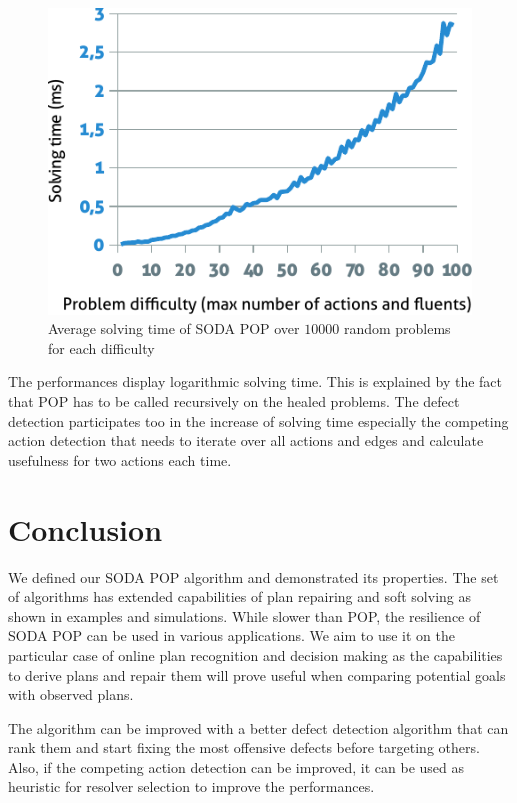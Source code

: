 \documentclass[]{article}
\begin{document}
\begin{figure}[htbp]
\centering
\includegraphics{graphics/performance.pdf}
\caption{Average solving time of SODA POP over \(10 000\) random
problems for each difficulty\label{fig:performance}}
\end{figure}

The performances display logarithmic solving time. This is explained by
the fact that POP has to be called recursively on the healed problems.
The defect detection participates too in the increase of solving time
especially the competing action detection that needs to iterate over all
actions and edges and calculate usefulness for two actions each time.

\section*{Conclusion}\label{conclusion}

We defined our SODA POP algorithm and demonstrated its properties. The
set of algorithms has extended capabilities of plan repairing and soft
solving as shown in examples and simulations. While slower than POP, the
resilience of SODA POP can be used in various applications. We aim to
use it on the particular case of online plan recognition and decision
making as the capabilities to derive plans and repair them will prove
useful when comparing potential goals with observed plans.

The algorithm can be improved with a better defect detection algorithm
that can rank them and start fixing the most offensive defects before
targeting others. Also, if the competing action detection can be
improved, it can be used as heuristic for resolver selection to improve
the performances.
\end{document}

